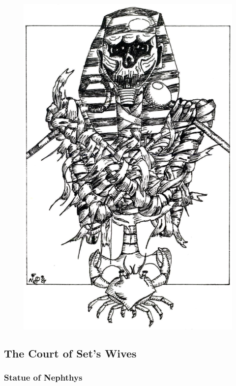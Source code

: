 \documentclass[letterpaper,serif]{module}
\begin{document}
\begin{figure}[t]
\includegraphics[width=\columnwidth]{module_art_interior.png}
\label{img:tomb}
\end{figure}

\lipsum[7-8]

\subsection{The Court of Set's Wives} %

\lipsum[9]

\subsubsection{Statue of Nephthys} %
\label{west_court}
\end{document}
